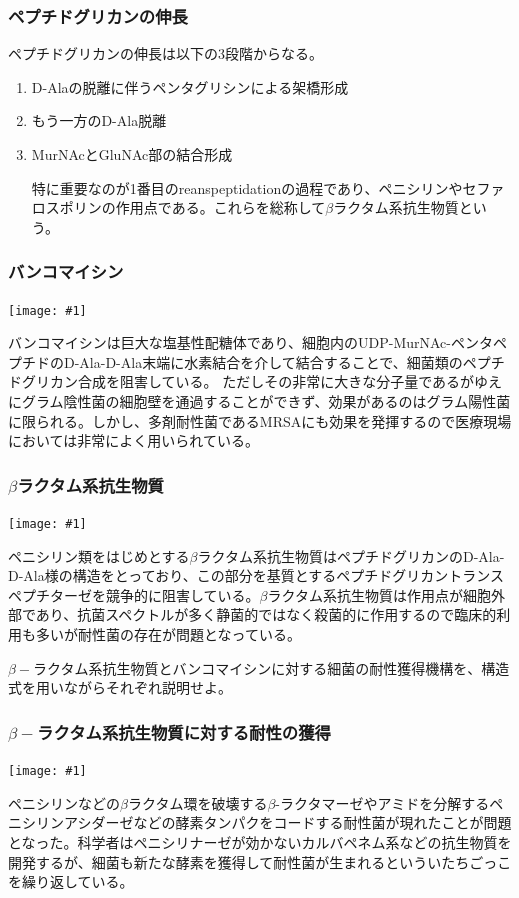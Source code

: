 \documentclass[a4paper,papersize,dvipdfmx]{jsarticle}
\newcommand{\pict}[2]{\begin{center} \texttt{[image: \#1]} \end{center}}   %
\begin{document}
\subsubsection*{ペプチドグリカンの伸長}
ペプチドグリカンの伸長は以下の3段階からなる。
\begin{enumerate}
\item D-Alaの脱離に伴うペンタグリシンによる架橋形成
\item もう一方のD-Ala脱離
\item MurNAcとGluNAc部の結合形成

特に重要なのが1番目のreanspeptidationの過程であり、ペニシリンやセファロスポリンの作用点である。これらを総称して$\beta$ラクタム系抗生物質という。

\end{enumerate}
\subsubsection*{バンコマイシン}
\pict{imgs-k/bkm.png}{10}
バンコマイシンは巨大な塩基性配糖体であり、細胞内のUDP-MurNAc-ペンタペプチドのD-Ala-D-Ala末端に水素結合を介して結合することで、細菌類のペプチドグリカン合成を阻害している。
ただしその非常に大きな分子量であるがゆえにグラム陰性菌の細胞壁を通過することができず、効果があるのはグラム陽性菌に限られる。しかし、多剤耐性菌であるMRSAにも効果を発揮するので医療現場においては非常によく用いられている。

\subsubsection*{$\beta$ラクタム系抗生物質}
\pict{imgs-k/btr.png}{6}
ペニシリン類をはじめとする$\beta$ラクタム系抗生物質はペプチドグリカンのD-Ala-D-Ala様の構造をとっており、この部分を基質とするペプチドグリカントランスペプチターゼを競争的に阻害している。$\beta$ラクタム系抗生物質は作用点が細胞外部であり、抗菌スペクトルが多く静菌的ではなく殺菌的に作用するので臨床的利用も多いが耐性菌の存在が問題となっている。

\begin{tcolorbox}[colback=white,colbacktitle=black,coltitle=white,title={4.}]
$\beta -$ラクタム系抗生物質とバンコマイシンに対する細菌の耐性獲得機構を、構造式を用いながらそれぞれ説明せよ。
\end{tcolorbox}


\subsubsection*{$\beta -$ラクタム系抗生物質に対する耐性の獲得}
\pict{imgs-k/rktm.jpg}{10}
ペニシリンなどの$\beta$ラクタム環を破壊する$\beta$-ラクタマーゼやアミドを分解するペニシリンアシダーゼなどの酵素タンパクをコードする耐性菌が現れたことが問題となった。科学者はペニシリナーゼが効かないカルバペネム系などの抗生物質を開発するが、細菌も新たな酵素を獲得して耐性菌が生まれるといういたちごっこを繰り返している。
\end{document}

